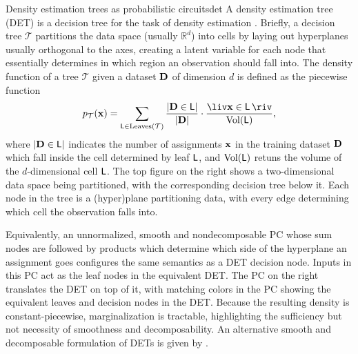 \begin{example}[sidebyside,lefthand width=0.55\textwidth]{Density estimation trees as probabilistic circuits}{det}
  A density estimation tree (DET) is a decision tree for the task of density estimation
  \citep{ram11}. Briefly, a decision tree $\mathcal{T}$ partitions the data space (usually
  $\mathbb{R}^d$) into cells by laying out hyperplanes usually orthogonal to the axes, creating a
  latent variable for each node that essentially determines in which region an observation should
  fall into. The density function of a tree $\mathcal{T}$ given a dataset $\mathbf{D}$ of dimension
  $d$ is defined as the piecewise function
  \begin{equation}
    p_\mathcal{T}(\set{x})=\sum_{\Leaf\in\operatorname{Leaves}(\mathcal{T})}\frac{\left|\set{D}\in\Leaf\right|}{|\set{D}|}\cdot\frac{\liv\set{x}\in\Leaf\riv}{\operatorname{Vol}(\Leaf)},
  \end{equation}
  where $\left|\mathbf{D}\in\operatorname{\textup{\textsf{L}}}\right|$ indicates the number of assignments $\mathbf{x}$ in the
  training dataset $\mathbf{D}$ which fall inside the cell determined by leaf $\operatorname{\textup{\textsf{L}}}$, and
  $\operatorname{Vol}(\operatorname{\textup{\textsf{L}}})$ retuns the volume of the $d$-dimensional cell $\operatorname{\textup{\textsf{L}}}$. The top figure
  on the right shows a two-dimensional data space being partitioned, with the corresponding
  decision tree below it. Each node in the tree is a (hyper)plane partitioning data, with every
  edge determining which cell the observation falls into.

  Equivalently, an unnormalized, smooth and nondecomposable PC whose sum nodes are followed by
  products which determine which side of the hyperplane an assignment goes configures the same
  semantics as a DET decision node. Inputs in this PC act as the leaf nodes in the equivalent DET.
  The PC on the right translates the DET on top of it, with matching colors in the PC showing the
  equivalent leaves and decision nodes in the DET. Because the resulting density is
  constant-piecewise, marginalization is tractable, highlighting the sufficiency but not necessity
  of smoothness and decomposability. An alternative smooth and decomposable formulation of DETs is
  given by \citet{correia20}.
  \tcblower
  \centering
\end{example}

